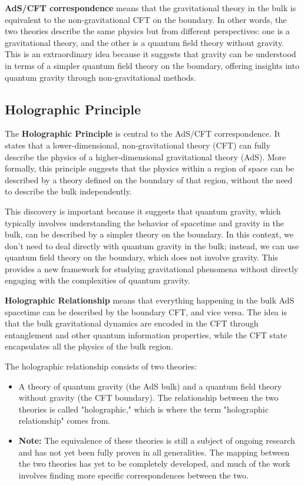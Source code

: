 \documentclass[12pt]{article}
\begin{document}
        \textbf{AdS/CFT correspondence} means that the gravitational theory in the bulk is equivalent to the non-gravitational CFT on the boundary. In other words, the two theories describe the same physics but from different perspectives: one is a gravitational theory, and the other is a quantum field theory without gravity. This is an extraordinary idea because it suggests that gravity can be understood in terms of a simpler quantum field theory on the boundary, offering insights into quantum gravity through non-gravitational methods.

    \subsection{Holographic Principle}
        The \textbf{Holographic Principle} is central to the AdS/CFT correspondence. It states that a lower-dimensional, non-gravitational theory (CFT) can fully describe the physics of a higher-dimensional gravitational theory (AdS). More formally, this principle suggests that the physics within a region of space can be described by a theory defined on the boundary of that region, without the need to describe the bulk independently.

        This discovery is important because it suggests that quantum gravity, which typically involves understanding the behavior of spacetime and gravity in the bulk, can be described by a simpler theory on the boundary. In this context, we don't need to deal directly with quantum gravity in the bulk; instead, we can use quantum field theory on the boundary, which does not involve gravity. This provides a new framework for studying gravitational phenomena without directly engaging with the complexities of quantum gravity. 

        \textbf{Holographic Relationship} means that everything happening in the bulk AdS spacetime can be described by the boundary CFT, and vice versa. The idea is that the bulk gravitational dynamics are encoded in the CFT through entanglement and other quantum information properties, while the CFT state encapsulates all the physics of the bulk region.

        The holographic relationship consists of two theories:
        \begin{itemize}
            \item A theory of quantum gravity (the AdS bulk) and a quantum field theory without gravity (the CFT boundary). The relationship between the two theories is called "holographic," which is where the term "holographic relationship" comes from.
            \item \textbf{Note:} The equivalence of these theories is still a subject of ongoing research and has not yet been fully proven in all generalities. The mapping between the two theories has yet to be completely developed, and much of the work involves finding more specific correspondences between the two.
        \end{itemize}
\end{document}
